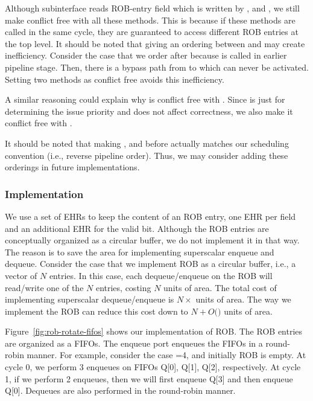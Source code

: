 Although subinterface  reads ROB-entry field  which is written by ,  and , we still make  conflict free with all these methods.
This is because if these methods are called in the same cycle, they are guaranteed to access different ROB entries at the top level.
It should be noted that giving an ordering between  and  may create inefficiency.
Consider the case that we order  after  because  is called in earlier pipeline stage.
Then, there is a bypass path from  to  which can never be activated.
Setting two methods as conflict free avoids this inefficiency.

A similar reasoning could explain why  is conflict free with .
Since  is just for determining the issue priority and does not affect correctness, we also make it conflict free with .

It should be noted that making ,  and  before  actually matches our scheduling convention (i.e., reverse pipeline order).
Thus, we may consider adding these orderings in future implementations.

\subsubsection{Implementation}
We use a set of EHRs to keep the content of an ROB entry, one EHR per field and an additional EHR for the valid bit.
Although the ROB entries are conceptually organized as a circular buffer, we do not implement it in that way.
The reason is to save the area for implementing superscalar enqueue and dequeue.
Consider the case that we implement ROB as a circular buffer, i.e., a vector of $N$ entries.
In this case, each dequeue/enqueue on the ROB will read/write one of the $N$ entries, costing $N$ units of area.
The total cost of implementing superscalar dequeue/enqueue is $N \times$ units of area.
The way we implement the ROB can reduce this cost down to $N +O($$)$ units of area.

Figure~\ref{fig:rob-rotate-fifos} shows our implementation of ROB.
The ROB entries are organized as a  FIFOs.
The enqueue port enqueues the FIFOs in a round-robin manner.
For example, consider the case =4, and initially ROB is empty.
At cycle 0, we perform 3 enqueues on FIFOs Q[0], Q[1], Q[2], respectively.
At cycle 1, if we perform 2 enqueues, then we will first enqueue Q[3] and then enqueue Q[0].
Dequeues are also performed in the round-robin manner.

